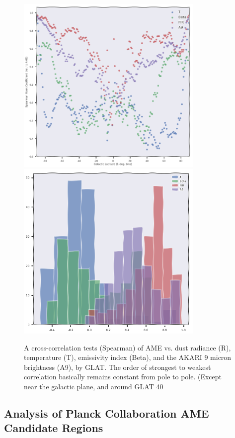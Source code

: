 \documentclass[preprint2,longabstract]{aastex}
\begin{document}
\begin{figure}
\label{fig:PlanckModBBvsAMEandA9_byGLAT}
\includegraphics[width=90mm]{../Plots/PlanckModBBvsAMEandA9_byGLAT.png}
\includegraphics[width=90mm]{../Plots/PlanckModBBvsAMEandA9_hist.png}
\centering
\caption{A cross-correlation tests (Spearman) of AME vs. dust radiance (R), temperature (T),  emissivity index (Beta), and the AKARI 9 micron brightness (A9), by GLAT. The order of strongest to weakest correlation basically remains constant from pole to pole. (Except near the galactic plane, and around GLAT 40  }
\end{figure}


\subsection{Analysis of Planck Collaboration AME Candidate Regions}
\end{document}
